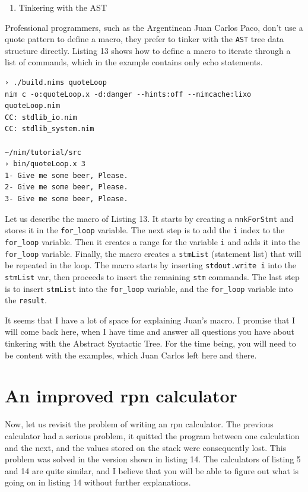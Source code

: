 \documentclass[
  12pt,
]{book}
\providecommand{\tightlist}{%
  \setlength{\itemsep}{0pt}\setlength{\parskip}{0pt}}
\begin{document}
\begin{enumerate}
\def\labelenumi{(\arabic{enumi})}
\setcounter{enumi}{12}
\tightlist
\item
  Tinkering with the AST
\end{enumerate}

Professional programmers, such as the Argentinean Juan Carlos Paco,
don't use a quote pattern to define a macro, they prefer to tinker with
the \texttt{AST} tree data structure directly. Listing 13 shows how to
define a macro to iterate through a list of commands, which in the
example contains only echo statements.

\begin{verbatim}
› ./build.nims quoteLoop
nim c -o:quoteLoop.x -d:danger --hints:off --nimcache:lixo quoteLoop.nim
CC: stdlib_io.nim
CC: stdlib_system.nim

~/nim/tutorial/src
› bin/quoteLoop.x 3
1- Give me some beer, Please.
2- Give me some beer, Please.
3- Give me some beer, Please.
\end{verbatim}

\pagebreak

Let us describe the macro of Listing 13. It starts by creating a
\texttt{nnkForStmt} and stores it in the \texttt{for\_loop} variable.
The next step is to add the \texttt{i} index to the \texttt{for\_loop}
variable. Then it creates a range for the variable \texttt{i} and adds
it into the \texttt{for\_loop} variable. Finally, the macro creates a
\texttt{stmList} (statement list) that will be repeated in the loop. The
macro starts by inserting \texttt{stdout.write\ i} into the
\texttt{stmList} var, then proceeds to insert the remaining \texttt{stm}
commands. The last step is to insert \texttt{stmList} into the
\texttt{for\_loop} variable, and the \texttt{for\_loop} variable into
the \texttt{result}.

It seems that I have a lot of space for explaining Juan's macro. I
promise that I will come back here, when I have time and answer all
questions you have about tinkering with the Abstract Syntactic Tree. For
the time being, you will need to be content with the examples, which
Juan Carlos left here and there.

\chapter{An improved rpn calculator}\label{an-improved-rpn-calculator}

Now, let us revisit the problem of writing an rpn calculator. The
previous calculator had a serious problem, it quitted the program
between one calculation and the next, and the values stored on the stack
were consequently lost. This problem was solved in the version shown in
listing 14. The calculators of listing 5 and 14 are quite similar, and I
believe that you will be able to figure out what is going on in listing
14 without further explanations.
\end{document}
